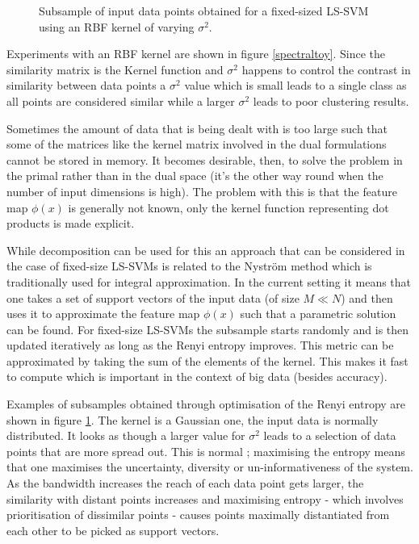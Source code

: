 \begin{figure}
\begin{minipage}{\linewidth}
    \caption*{$\sigma^2=100.0$}
\end{minipage}
\caption{Subsample of input data points obtained for a fixed-sized LS-SVM using an RBF kernel of varying $\sigma^2$.}
\label{fixedsample}
\end{figure}

\par Experiments with an RBF kernel are shown in figure \ref{spectraltoy}. Since the similarity matrix is the Kernel function and $\sigma^2$ happens to control the contrast in similarity between data points a $\sigma^2$ value which is small leads to a single class as all points are considered similar while a larger $\sigma^2$ leads to poor clustering results.


Sometimes the amount of data that is being dealt with is too large such that some of the matrices like the kernel matrix involved in the dual formulations cannot be stored in memory. It becomes desirable, then, to solve the problem in the primal rather than in the dual space (it's the other way round when the number of input dimensions is high). The problem with this is that the feature map $\phi(x)$ is generally not known, only the kernel function representing dot products is made explicit.

\par While decomposition can be used for this an approach that can be considered in the case of fixed-size LS-SVMs is related to the Nystr\"om method which is traditionally used for integral approximation. In the current setting it means that one takes a set of support vectors of the input data (of size $M\ll N$) and then uses it to approximate the feature map $\phi(x)$ such that a parametric solution can be found. For fixed-size LS-SVMs the subsample starts randomly and is then updated iteratively as long as the Renyi entropy improves. This metric can be approximated by taking the sum of the elements of the kernel. This makes it fast to compute which is important in the context of big data (besides accuracy).

\par Examples of subsamples obtained through optimisation of the Renyi entropy are shown in figure \ref{fixedsample}. The kernel is a Gaussian one, the input data is normally distributed. It looks as though a larger value for $\sigma^2$ leads to a selection of data points that are more spread out. This is normal ; maximising the entropy means that one maximises the uncertainty, diversity or un-informativeness of the system. As the bandwidth increases the reach of each data point gets larger, the similarity with distant points increases and maximising entropy - which involves prioritisation of dissimilar points - causes points maximally distantiated from each other to be picked as support vectors.


